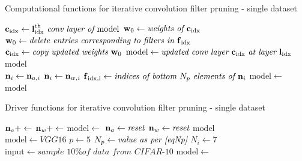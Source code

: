 \documentclass{article}
\begin{document}
\begin{algorithm}[t]
	\caption{Computational functions for iterative convolution filter pruning - single dataset} \label{FilterPruneComps}
	\begin{algorithmic}[1]
			\State $\bm{\mathrm{c}}_\mathrm{idx} \gets \bm{\mathrm{l}}_\mathrm{idx}^\mathrm{th}\textit{ conv layer of } \mathrm{model}$
			\State $\bm{\mathrm{w}}_0 \gets \textit{weights of  } \bm{\mathrm{c}}_\mathrm{idx}$
			\State $\bm{\mathrm{w}}_0 \gets \textit{delete entries corresponding to filters in }\bm{\mathrm{f}}_\mathrm{idx}$
			\State $\bm{\mathrm{c}}_\mathrm{idx} \gets \textit{copy updated weights }\bm{\mathrm{w}}_0$
			\State $\mathrm{model} \gets \textit{updated conv layer }\bm{\mathrm{c}}_\mathrm{idx} \textit{ at layer }\bm{\mathrm{l}}_\mathrm{idx}$
			\State \Return $\mathrm{model}$
		\EndFunction
		\\
				\State $\bm{\mathrm{n}}_{i} \gets \bm{\mathrm{n}}_{a,i}$
				\State $\bm{\mathrm{n}}_{i} \gets \bm{\mathrm{n}}_{w,i}$
			\EndIf
			\State $\bm{\mathrm{f}}_\mathrm{idx,i} \gets \textit{indices of bottom $N_p$ elements of }\bm{\mathrm{n}}_{i}$
			\State $\mathrm{model} \gets$ 
		\EndFor
%		
		\State \Return $\mathrm{model}$
		\EndFunction
	\end{algorithmic}
\end{algorithm}

\begin{algorithm}[t]
	\caption{Driver functions for iterative convolution filter pruning - single dataset} \label{FilterPruneDrivers}
	\begin{algorithmic}[1]
				\State $\bm{\mathrm{n}}_{a} +\gets$ 
				\State $\bm{\mathrm{n}}_{w} +\gets$ 
					\State $\mathrm{model} \gets$ 
					\State $\bm{\mathrm{n}}_{a} \gets \textit{reset}$
					\State $\bm{\mathrm{n}}_{w} \gets \textit{reset}$
				\EndIf
			\EndFor
			\State \Return $\mathrm{model}$
		\EndFunction\\
%		
		\State $\mathrm{model} \gets \textit{VGG16}$
		\State $p \gets 5$
		\State $N_p \gets \textit{value as per \eqref{eqNp}}$
		\State $N_i \gets 7$
		\State $\mathrm{input} \gets \textit{sample 10\% of data from CIFAR-10}$
			\State $\mathrm{model} \gets $ 
		\EndWhile
	\end{algorithmic}
\end{algorithm}
\end{document}
